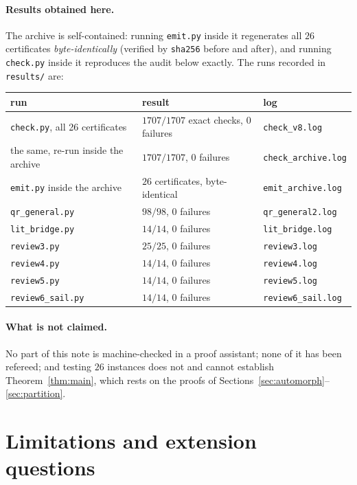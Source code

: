 \documentclass[11pt]{article}
\theoremstyle{definition}
\theoremstyle{remark}
\begin{document}
\paragraph{Results obtained here.}
The archive is self-contained: running \texttt{emit.py} inside it regenerates all $26$
certificates \emph{byte-identically} (verified by \texttt{sha256} before and after), and running
\texttt{check.py} inside it reproduces the audit below exactly. The runs recorded in
\texttt{results/} are:
\begin{center}\small
\begin{tabular}{@{}lll@{}}
\toprule
run & result & log \\
\midrule
\texttt{check.py}, all 26 certificates & $1707/1707$ exact checks, $0$ failures &
  \texttt{check\_v8.log} \\
\quad the same, re-run inside the archive & $1707/1707$, $0$ failures &
  \texttt{check\_archive.log} \\
\texttt{emit.py} inside the archive & $26$ certificates, byte-identical &
  \texttt{emit\_archive.log} \\
\texttt{qr\_general.py} & $98/98$, $0$ failures & \texttt{qr\_general2.log} \\
\texttt{lit\_bridge.py} & $14/14$, $0$ failures & \texttt{lit\_bridge.log} \\
\texttt{review3.py} & $25/25$, $0$ failures & \texttt{review3.log} \\
\texttt{review4.py} & $14/14$, $0$ failures & \texttt{review4.log} \\
\texttt{review5.py} & $14/14$, $0$ failures & \texttt{review5.log} \\
\texttt{review6\_sail.py} & $14/14$, $0$ failures & \texttt{review6\_sail.log} \\
\bottomrule
\end{tabular}
\end{center}

\paragraph{What is not claimed.}
No part of this note is machine-checked in a proof assistant; none of it has been refereed; and
testing $26$ instances does not and cannot establish Theorem~\ref{thm:main}, which rests
on the proofs of Sections~\ref{sec:automorph}--\ref{sec:partition}.

\section{Limitations and extension questions}\label{sec:limits}
\end{document}
